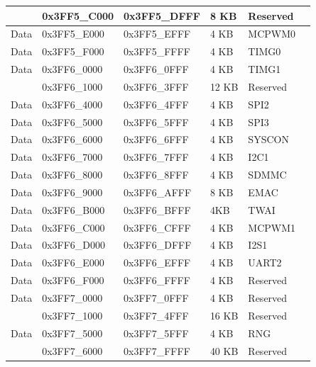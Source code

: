 \begin{longtable}[c]{ |p{1.5cm}|p{3cm}|p{3cm}|p{1.5cm}|p{3cm}|p{3cm}| }
    \rowcolor{gray!25}
    & 0x3FF5\_C000 & 0x3FF5\_DFFF & 8 KB & Reserved & \\
    
    \hline
    Data & 0x3FF5\_E000 & 0x3FF5\_EFFF & 4 KB & MCPWM0 & \\
    \hline
    Data & 0x3FF5\_F000 & 0x3FF5\_FFFF & 4 KB & TIMG0 & \\
    \hline
    Data & 0x3FF6\_0000 & 0x3FF6\_0FFF & 4 KB & TIMG1 & \\
    \hline
    \rowcolor{gray!25}
    & 0x3FF6\_1000 & 0x3FF6\_3FFF & 12 KB & Reserved & \\
    \hline
    Data & 0x3FF6\_4000 & 0x3FF6\_4FFF & 4 KB & SPI2 & \\
    \hline
    Data & 0x3FF6\_5000 & 0x3FF6\_5FFF & 4 KB & SPI3 & \\
    \hline
    Data & 0x3FF6\_6000 & 0x3FF6\_6FFF & 4 KB & SYSCON & \\
    \hline
    Data & 0x3FF6\_7000 & 0x3FF6\_7FFF & 4 KB & I2C1 & \\
    \hline
    Data & 0x3FF6\_8000 & 0x3FF6\_8FFF & 4 KB & SDMMC & \\
    \hline
    Data & 0x3FF6\_9000 & 0x3FF6\_AFFF & 8 KB & EMAC & \\
    \hline
    
    Data & 0x3FF6\_B000 & 0x3FF6\_BFFF & 4KB & TWAI & \\
    \hline
    Data & 0x3FF6\_C000 & 0x3FF6\_CFFF & 4 KB & MCPWM1 & \\
    \hline
    Data & 0x3FF6\_D000 & 0x3FF6\_DFFF & 4 KB & I2S1 & \\
    \hline
    Data & 0x3FF6\_E000 & 0x3FF6\_EFFF & 4 KB & UART2 & \\
    \hline
    Data & 0x3FF6\_F000 & 0x3FF6\_FFFF & 4 KB & Reserved & \\
    \hline
    Data & 0x3FF7\_0000 & 0x3FF7\_0FFF & 4 KB & Reserved & \\
    \hline
    
    \rowcolor{gray!25}
    & 0x3FF7\_1000 & 0x3FF7\_4FFF & 16 KB & Reserved & \\
    
    \hline
    Data & 0x3FF7\_5000 & 0x3FF7\_5FFF & 4 KB & RNG & \\
    \hline
    \rowcolor{gray!25}
    & 0x3FF7\_6000 & 0x3FF7\_FFFF & 40 KB & Reserved & \\
    
\end{longtable}

